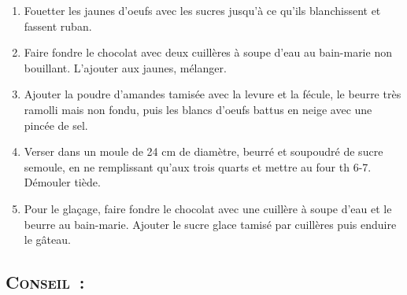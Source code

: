 \begin{enumerate}
\item Fouetter les jaunes d'oeufs avec les sucres jusqu'\`a ce qu'ils blanchissent et fassent ruban.
\item Faire fondre le chocolat avec deux cuill\`eres \`a soupe d'eau au bain-marie non bouillant. L'ajouter aux jaunes, m\'elanger.
\item Ajouter la poudre d'amandes tamis\'ee avec la levure et la f\'ecule, le beurre tr\`es ramolli mais non fondu, puis les blancs d'oeufs battus en neige avec une pinc\'ee de sel.
\item Verser dans un moule de 24 cm de diam\`etre, beurr\'e et soupoudr\'e de sucre semoule, en ne remplissant qu'aux trois quarts et mettre au four th 6-7. D\'emouler ti\`ede.
\item Pour le glaçage, faire fondre le chocolat avec une cuill\`ere \`a soupe d'eau et le beurre au bain-marie. Ajouter le sucre glace tamis\'e par cuill\`eres puis enduire le g\^ateau.

\end{enumerate}
\subsection*{\textsc{Conseil~:}}
